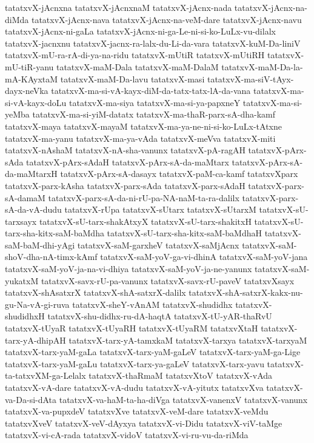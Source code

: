 {tatatxvX-jAcnxna
tatatxvX-jAcnxnaM
tatatxvX-jAcnx-nada
tatatxvX-jAcnx-na-diMda
tatatxvX-jAcnx-nava
tatatxvX-jAcnx-na-veM-dare
tatatxvX-jAcnx-navu
tatatxvX-jAcnx-ni-gaLa
tatatxvX-jAcnx-ni-ga-Le-ni-si-ko-LuLx-vu-dilalx
tatatxvX-jacnxnu
tatatxvX-jacnx-ra-lalx-du-Li-da-vara
tatatxvX-kuM-Da-liniV
tatatxvX-mU-ra-rA-di-ya-na-ridu
tatatxvX-mUtiR
tatatxvX-mUtiRH
tatatxvX-mU-tiR-yanu
tatatxvX-maM-Dala
tatatxvX-maM-DalaM
tatatxvX-maM-Da-la-mA-KAyxtaM
tatatxvX-maM-Da-lavu
tatatxvX-masi
tatatxvX-ma-siV-tAyx-dayx-neVka
tatatxvX-ma-si-vA-kayx-diM-da-tatx-tatx-lA-da-vana
tatatxvX-ma-si-vA-kayx-doLu
tatatxvX-ma-siya
tatatxvX-ma-si-ya-papxneY
tatatxvX-ma-si-yeMba
tatatxvX-ma-si-yiM-datatx
tatatxvX-ma-thaR-parx-sA-dha-kamf
tatatxvX-maya
tatatxvX-mayaM
tatatxvX-ma-ya-ne-ni-si-ko-LuLx-tAtxne
tatatxvX-ma-yanu
tatatxvX-ma-ya-vAda
tatatxvX-meVva
tatatxvX-miti
tatatxvX-nAshaM
tatatxvX-nA-sha-vanunx
tatatxvX-pA-ragAH
tatatxvX-pArx-sAda
tatatxvX-pArx-sAdaH
tatatxvX-pArx-sA-da-maMtarx
tatatxvX-pArx-sA-da-maMtarxH
tatatxvX-pArx-sA-dasayx
tatatxvX-paM-ca-kamf
tatatxvXparx
tatatxvX-parx-kAsha
tatatxvX-parx-sAda
tatatxvX-parx-sAdaH
tatatxvX-parx-sA-damaM
tatatxvX-parx-sA-da-ni-rU-pa-NA-naM-ta-ra-dalilx
tatatxvX-parx-sA-da-vA-dudu
tatatxvX-rUpa
tatatxvX-sUtarx
tatatxvX-sUtarxM
tatatxvX-sU-tarxsayx
tatatxvX-sU-tarx-shakAtxyX
tatatxvX-sU-tarx-shakitxH
tatatxvX-sU-tarx-sha-kitx-saM-baMdha
tatatxvX-sU-tarx-sha-kitx-saM-baMdhaH
tatatxvX-saM-baM-dhi-yAgi
tatatxvX-saM-garxheV
tatatxvX-saMjAcnx
tatatxvX-saM-shoV-dha-nA-timx-kAmf
tatatxvX-saM-yoV-ga-vi-dhinA
tatatxvX-saM-yoV-jana
tatatxvX-saM-yoV-ja-na-vi-dhiya
tatatxvX-saM-yoV-ja-ne-yanunx
tatatxvX-saM-yukatxM
tatatxvX-savx-rU-pa-vanunx
tatatxvX-savx-rU-paveV
tatatxvXsayx
tatatxvX-shAsatxrX
tatatxvX-shA-satxrX-dalilx
tatatxvX-shA-satxrX-kakx-nu-gu-Na-vA-gi-ruva
tatatxvX-sheY-vAnAM
tatatxvX-shudidhx
tatatxvX-shudidhxH
tatatxvX-shu-didhx-ru-dA-haqtA
tatatxvX-tU-yAR-thaRvU
tatatxvX-tUyaR
tatatxvX-tUyaRH
tatatxvX-tUyaRM
tatatxvXtaH
tatatxvX-tarx-yA-dhipAH
tatatxvX-tarx-yA-tamxkaM
tatatxvX-tarxya
tatatxvX-tarxyaM
tatatxvX-tarx-yaM-gaLa
tatatxvX-tarx-yaM-gaLeV
tatatxvX-tarx-yaM-ga-Lige
tatatxvX-tarx-yaM-gaLu
tatatxvX-tarx-ya-gaLeV
tatatxvX-tarx-yavu
tatatxvX-ta-tatxvXM-ga-Lelalx
tatatxvX-thaRmaM
tatatxvXtoV
tatatxvX-vAda
tatatxvX-vA-dare
tatatxvX-vA-dudu
tatatxvX-vA-yitutx
tatatxvXva
tatatxvX-va-Da-si-dAta
tatatxvX-va-haM-ta-ha-diVga
tatatxvX-vanenxV
tatatxvX-vanunx
tatatxvX-va-pupxdeV
tatatxvXve
tatatxvX-veM-dare
tatatxvX-veMdu
tatatxvXveV
tatatxvX-veV-dAyxya
tatatxvX-vi-Didu
tatatxvX-viV-taMge
tatatxvX-vi-cA-rada
tatatxvX-vidoV
tatatxvX-vi-ru-vu-da-riMda
}
